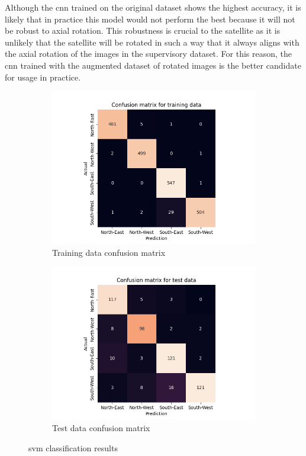 \documentclass[10pt,twocolumn,letterpaper]{article}
\begin{document}
Although the \acrshort{cnn} trained on the original dataset shows the highest accuracy, it is likely that in practice this model would not perform the best because it will not be robust to axial rotation. This robustness is crucial to the satellite as it is unlikely that the satellite will be rotated in such a way that it always aligns with the axial rotation of the images in the supervisory dataset. For this reason, the \acrshort{cnn} trained with the augmented dataset of rotated images is the better candidate for usage in practice.

\begin{figure}
  \centering
  \begin{subfigure}{.33\linewidth}
    \includegraphics[width=\linewidth, trim={7em, 0em, 9em, 5em}, clip]{svm_cfsn_train}
    \caption{Training data confusion matrix}
    \label{fig:svm_train}
  \end{subfigure}
  \begin{subfigure}{0.33\linewidth}
    \includegraphics[width=\linewidth, trim={7em, 0em, 9em, 5em}, clip]{svm_cfsn_test}
    \caption{Test data confusion matrix}
    \label{fig:svm_test}
  \end{subfigure}
  \caption{\acrlong{svm} classification results}
  \label{fig:svm_res}
\end{figure}
\end{document}
